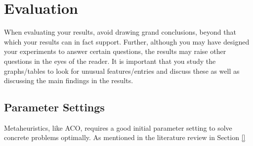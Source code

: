 \section{Evaluation}

When evaluating your results, avoid drawing grand conclusions, beyond that which your results can in fact support. Further, although you may have designed your experiments to answer certain questions, the results may raise other questions in the eyes of the reader. It is important that you study the graphs/tables to look for unusual features/entries and discuss these as well as discussing the main findings in the results. 




\subsection{Parameter Settings}

Metaheuristics, like ACO, requires a good initial parameter setting to solve concrete problems optimally. As mentioned in the literature review in Section \vref{}

